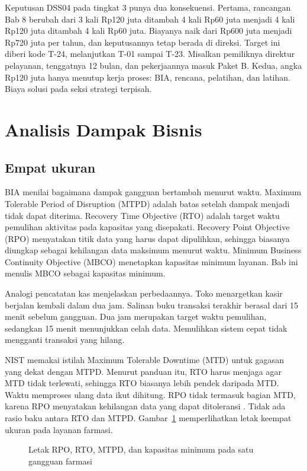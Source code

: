 Keputusan DSS04 pada tingkat 3 punya dua konsekuensi. Pertama, rancangan Bab 8 berubah dari 3 kali
Rp120 juta ditambah 4 kali Rp60 juta menjadi 4 kali Rp120 juta ditambah 4 kali Rp60 juta. Biayanya
naik dari Rp600 juta menjadi Rp720 juta per tahun, dan keputusannya tetap berada di direksi.
Target ini diberi kode T-24, melanjutkan T-01 sampai T-23. Misalkan pemiliknya direktur pelayanan,
tenggatnya 12 bulan, dan pekerjaannya masuk Paket B. Kedua, angka Rp120 juta hanya menutup
kerja proses: BIA, rencana, pelatihan, dan latihan. Biaya solusi pada seksi strategi terpisah.

\section{Analisis Dampak Bisnis}

\subsection*{Empat ukuran}

BIA menilai bagaimana dampak gangguan bertambah menurut waktu. Maximum Tolerable Period of
Disruption (MTPD) adalah batas setelah dampak menjadi tidak dapat diterima. Recovery Time
Objective (RTO) adalah target waktu pemulihan aktivitas pada kapasitas yang disepakati. Recovery
Point Objective (RPO) menyatakan titik data yang harus dapat dipulihkan, sehingga biasanya
diungkap sebagai kehilangan data maksimum menurut waktu. Minimum Business Continuity Objective
(MBCO) menetapkan kapasitas minimum layanan. Bab ini menulis MBCO sebagai kapasitas minimum.

Analogi pencatatan kas menjelaskan perbedaannya. Toko menargetkan kasir berjalan kembali dalam
dua jam. Salinan buku transaksi terakhir berasal dari 15 menit sebelum gangguan. Dua jam merupakan
target waktu pemulihan, sedangkan 15 menit menunjukkan celah data. Memulihkan sistem cepat tidak
mengganti transaksi yang hilang.

NIST memakai istilah Maximum Tolerable Downtime (MTD) untuk gagasan yang dekat dengan MTPD. Menurut
panduan itu, RTO harus menjaga agar MTD tidak terlewati, sehingga RTO biasanya lebih pendek daripada
MTD. Waktu memproses ulang data ikut dihitung. RPO tidak termasuk bagian MTD, karena RPO menyatakan
kehilangan data yang dapat ditoleransi \cite{c10-nist80034}. Tidak ada rasio baku antara RTO dan
MTPD. Gambar~\ref{fig:ch10-garis-waktu} memperlihatkan letak keempat ukuran pada layanan farmasi.

\begin{figure}[!htb]
  \centering
  
  \caption{Letak RPO, RTO, MTPD, dan kapasitas minimum pada satu gangguan farmasi}
  \label{fig:ch10-garis-waktu}
\end{figure}

